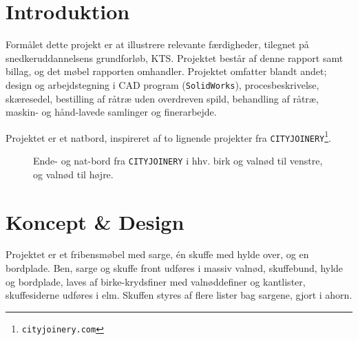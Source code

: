 \section*{Introduktion}
Formålet dette projekt er at illustrere relevante færdigheder, tilegnet på
snedkeruddannelsens grundforløb, KTS.
Projektet består af denne rapport samt billag, og det møbel rapporten omhandler.
Projektet omfatter blandt andet; design og arbejdstegning i CAD program
(\texttt{SolidWorks}), procesbeskrivelse, skæresedel, bestilling af råtræ uden
overdreven spild, behandling af råtræ, maskin- og hånd-lavede samlinger og finerarbejde.

Projektet er et natbord, inspireret af to lignende projekter fra
\texttt{CITYJOINERY}\nolinebreak \footnote{\texttt{cityjoinery.com}}.

\begin{figure}[htb]
\centering
{}
\caption{Ende- og nat-bord fra \texttt{CITYJOINERY} i hhv. birk og valnød til
venstre, og valnød til højre.}
\end{figure}

\section*{Koncept \& Design}
Projektet er et fribensmøbel med sarge, én skuffe med hylde over,
og en bordplade. Ben, sarge og skuffe front udføres i massiv valnød,
skuffebund, hylde og bordplade, laves af birke-krydsfiner med
valnøddefiner og kantlister, skuffesiderne udføres i elm. Skuffen styres af
flere lister bag sargene, gjort i ahorn.

